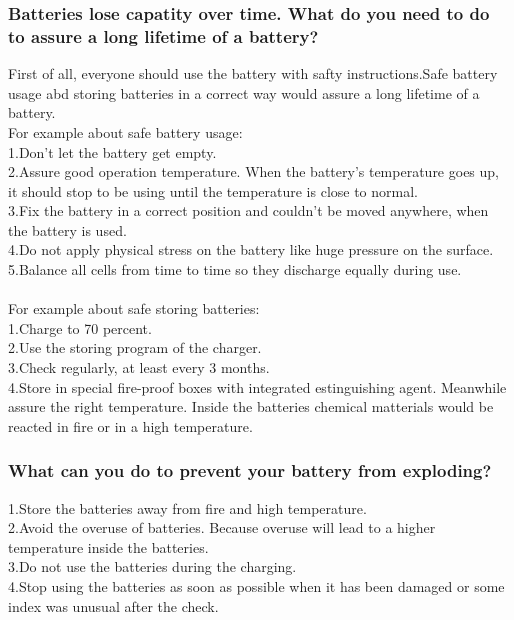 \documentclass{ROS}
\begin{document}
\subsubsection*{Batteries lose capatity over time. What do you need to do to assure a long lifetime of a battery?}
First of all, everyone should use the battery with safty instructions.Safe battery usage abd storing batteries in a correct way would assure a long lifetime of a battery.\\
For example about safe battery usage:\\
1.Don't let the battery get empty.\\
2.Assure good operation temperature. When the battery's temperature goes up, it should stop to be using until the temperature is close to normal.\\
3.Fix the battery in a correct position and couldn't be moved anywhere, when the battery is used.\\
4.Do not apply physical stress on the battery like huge pressure on the surface.\\
5.Balance all cells from time to time so they discharge equally during use. \\
\\
For example about safe storing batteries:\\
1.Charge to 70 percent.\\
2.Use the storing program of the charger.\\
3.Check regularly, at least every 3 months.\\
4.Store in special fire-proof boxes with integrated estinguishing agent. Meanwhile assure the right temperature. Inside the batteries chemical matterials would be reacted in fire or in a high temperature.\\

\subsubsection*{What can you do to prevent your battery from exploding?}
1.Store the batteries away from fire and high temperature.\\
2.Avoid the overuse of batteries. Because overuse will lead to a higher temperature inside the batteries.\\
3.Do not use the batteries during the charging.\\
4.Stop using the batteries as soon as possible when it has been damaged or some index was unusual after the check.\\
\\
\end{document}
